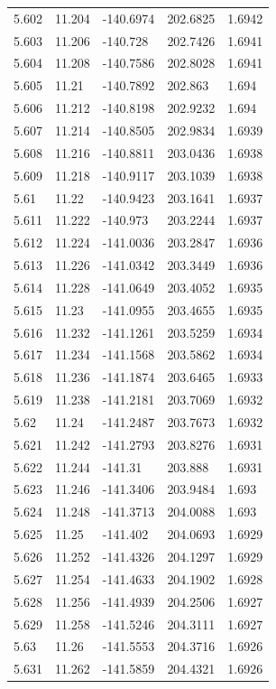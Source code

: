 \begin{tabular}{lllll}
5.602 & 11.204 & -140.6974 & 202.6825 & 1.6942 \\
5.603 & 11.206 & -140.728 & 202.7426 & 1.6941 \\
5.604 & 11.208 & -140.7586 & 202.8028 & 1.6941 \\
5.605 & 11.21 & -140.7892 & 202.863 & 1.694 \\
5.606 & 11.212 & -140.8198 & 202.9232 & 1.694 \\
5.607 & 11.214 & -140.8505 & 202.9834 & 1.6939 \\
5.608 & 11.216 & -140.8811 & 203.0436 & 1.6938 \\
5.609 & 11.218 & -140.9117 & 203.1039 & 1.6938 \\
5.61 & 11.22 & -140.9423 & 203.1641 & 1.6937 \\
5.611 & 11.222 & -140.973 & 203.2244 & 1.6937 \\
5.612 & 11.224 & -141.0036 & 203.2847 & 1.6936 \\
5.613 & 11.226 & -141.0342 & 203.3449 & 1.6936 \\
5.614 & 11.228 & -141.0649 & 203.4052 & 1.6935 \\
5.615 & 11.23 & -141.0955 & 203.4655 & 1.6935 \\
5.616 & 11.232 & -141.1261 & 203.5259 & 1.6934 \\
5.617 & 11.234 & -141.1568 & 203.5862 & 1.6934 \\
5.618 & 11.236 & -141.1874 & 203.6465 & 1.6933 \\
5.619 & 11.238 & -141.2181 & 203.7069 & 1.6932 \\
5.62 & 11.24 & -141.2487 & 203.7673 & 1.6932 \\
5.621 & 11.242 & -141.2793 & 203.8276 & 1.6931 \\
5.622 & 11.244 & -141.31 & 203.888 & 1.6931 \\
5.623 & 11.246 & -141.3406 & 203.9484 & 1.693 \\
5.624 & 11.248 & -141.3713 & 204.0088 & 1.693 \\
5.625 & 11.25 & -141.402 & 204.0693 & 1.6929 \\
5.626 & 11.252 & -141.4326 & 204.1297 & 1.6929 \\
5.627 & 11.254 & -141.4633 & 204.1902 & 1.6928 \\
5.628 & 11.256 & -141.4939 & 204.2506 & 1.6927 \\
5.629 & 11.258 & -141.5246 & 204.3111 & 1.6927 \\
5.63 & 11.26 & -141.5553 & 204.3716 & 1.6926 \\
5.631 & 11.262 & -141.5859 & 204.4321 & 1.6926 \\

\end{tabular}
